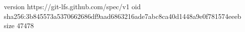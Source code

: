 version https://git-lfs.github.com/spec/v1
oid sha256:3b845573a5370662686df9aad6863216ade7abc8ca40d1448a9e0f781574eeeb
size 47478

